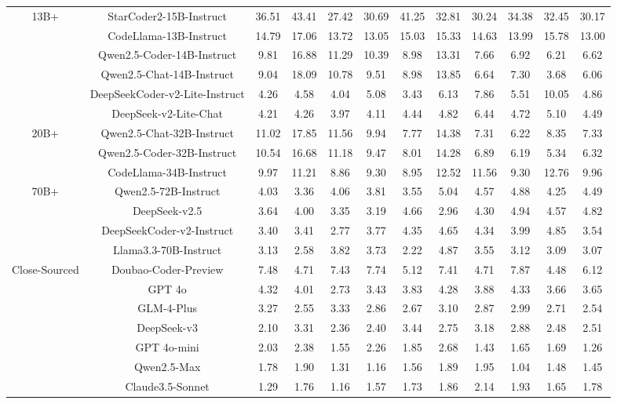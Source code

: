 \documentclass[11pt, a4paper, logo, copyright, nonumbering, amsart]{map}
\begin{document}
\begin{CJK*}{UTF8}{gbsn}
\begin{table*}[h!]
\begin{adjustbox}{width=\textwidth}
\begin{tabular}{c|c|cccccccccc}
    \midrule
    \multirow{6}{*}{13B+} 
    & StarCoder2-15B-Instruct & 36.51 & 43.41 & 27.42 & 30.69 & 41.25 & 32.81 & 30.24 & 34.38 & 32.45 & 30.17 \\
    & CodeLlama-13B-Instruct & 14.79 & 17.06 & 13.72 & 13.05 & 15.03 & 15.33 & 14.63 & 13.99 & 15.78 & 13.00 \\
    & Qwen2.5-Coder-14B-Instruct & 9.81 & 16.88 & 11.29 & 10.39 & 8.98 & 13.31 & 7.66 & 6.92 & 6.21 & 6.62 \\
    & Qwen2.5-Chat-14B-Instruct & 9.04 & 18.09 & 10.78 & 9.51 & 8.98 & 13.85 & 6.64 & 7.30 & 3.68 & 6.06 \\
    & DeepSeekCoder-v2-Lite-Instruct & 4.26 & 4.58 & 4.04 & 5.08 & 3.43 & 6.13 & 7.86 & 5.51 & 10.05 & 4.86 \\
    & DeepSeek-v2-Lite-Chat & 4.21 & 4.26 & 3.97 & 4.11 & 4.44 & 4.82 & 6.44 & 4.72 & 5.10 & 4.49 \\
        
    \midrule
    \multirow{3}{*}{20B+}
    & Qwen2.5-Chat-32B-Instruct & 11.02 & 17.85 & 11.56 & 9.94 & 7.77 & 14.38 & 7.31 & 6.22 & 8.35 & 7.33 \\
    & Qwen2.5-Coder-32B-Instruct & 10.54 & 16.68 & 11.18 & 9.47 & 8.01 & 14.28 & 6.89 & 6.19 & 5.34 & 6.32 \\
    & CodeLlama-34B-Instruct & 9.97 & 11.21 & 8.86 & 9.30 & 8.95 & 12.52 & 11.56 & 9.30 & 12.76 & 9.96 \\
        
    \midrule
    \multirow{4}{*}{70B+} 
    & Qwen2.5-72B-Instruct & 4.03 & 3.36 & 4.06 & 3.81 & 3.55 & 5.04 & 4.57 & 4.88 & 4.25 & 4.49 \\
    & DeepSeek-v2.5 & 3.64 & 4.00 & 3.35 & 3.19 & 4.66 & 2.96 & 4.30 & 4.94 & 4.57 & 4.82 \\
    & DeepSeekCoder-v2-Instruct & 3.40 & 3.41 & 2.77 & 3.77 & 4.35 & 4.65 & 4.34 & 3.99 & 4.85 & 3.54 \\
    & Llama3.3-70B-Instruct & 3.13 & 2.58 & 3.82 & 3.73 & 2.22 & 4.87 & 3.55 & 3.12 & 3.09 & 3.07 \\
        
    \midrule
    \multirow{7}{*}{Close-Sourced} 
    & Doubao-Coder-Preview & 7.48 & 4.71 & 7.43 & 7.74 & 5.12 & 7.41 & 4.71 & 7.87 & 4.48 & 6.12 \\
    & GPT 4o & 4.32 & 4.01 & 2.73 & 3.43 & 3.83 & 4.28 & 3.88 & 4.33 & 3.66 & 3.65 \\
    & GLM-4-Plus & 3.27 & 2.55 & 3.33 & 2.86 & 2.67 & 3.10 & 2.87 & 2.99 & 2.71 & 2.54 \\
    & DeepSeek-v3 & 2.10 & 3.31 & 2.36 & 2.40 & 3.44 & 2.75 & 3.18 & 2.88 & 2.48 & 2.51 \\
    & GPT 4o-mini & 2.03 & 2.38 & 1.55 & 2.26 & 1.85 & 2.68 & 1.43 & 1.65 & 1.69 & 1.26 \\
    & Qwen2.5-Max & 1.78 & 1.90 & 1.31 & 1.16 & 1.56 & 1.89 & 1.95 & 1.04 & 1.48 & 1.45 \\
    & Claude3.5-Sonnet & 1.29 & 1.76 & 1.16 & 1.57 & 1.73 & 1.86 & 2.14 & 1.93 & 1.65 & 1.78 \\
        

\end{tabular}
\end{adjustbox}
\end{table*}
\end{CJK*}
\end{document}
